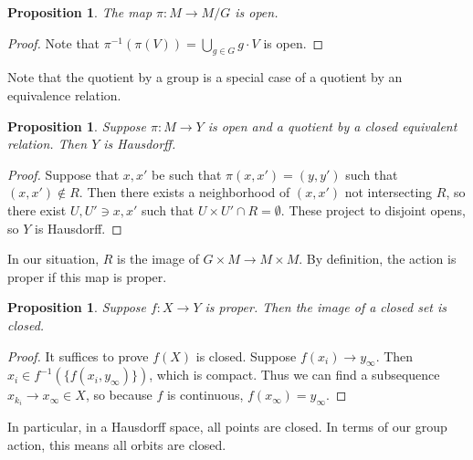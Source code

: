 \documentclass[leqno, openany]{memoir}
\newtheorem{prop}[thm]{Proposition}
\theoremstyle{definition}
\theoremstyle{remark}
\theoremstyle{plain}
\theoremstyle{definition}
\theoremstyle{remark}
\begin{document}
\begin{prop} The map $\pi: M \to M/G$ is open.  \end{prop}

\begin{proof} Note that $\pi^{-1}(\pi(V)) = \bigcup_{g \in G} g \cdot V$ is
open.  \end{proof}

Note that the quotient by a group is a special case of a quotient by an
equivalence relation.

\begin{prop} Suppose $\pi: M \to Y$ is open and a quotient by a closed
equivalent relation. Then $Y$ is Hausdorff.  \end{prop}

\begin{proof} Suppose that $x,x'$ be such that $\pi(x,x') = (y,y')$ such that
    $(x,x') \notin R$. Then there exists a neighborhood of $(x,x')$ not
    intersecting $R$, so there exist $U,U' \ni x,x'$ such that $U \times U'
    \cap R = \emptyset$. These project to disjoint opens, so $Y$ is Hausdorff.
\end{proof}

In our situation, $R$ is the image of $G \times M \to M \times M$. By
definition, the action is proper if this map is proper.

\begin{prop} Suppose $f: X \to Y$ is proper. Then the image of a closed set is
closed.  \end{prop}

\begin{proof} It suffices to prove $f(X)$ is closed. Suppose $f(x_i) \to
    y_{\infty}$. Then $x_i \in f^{-1}(\{ f(x_i, y_{\infty}) \})$, which is
    compact. Thus we can find a subsequence $x_{k_i} \to x_{\infty} \in X$, so
    because $f$ is continuous, $f(x_{\infty}) = y_{\infty}$.  \end{proof}

In particular, in a Hausdorff space, all points are closed. In terms of our
group action, this means all orbits are closed.
\end{document}
